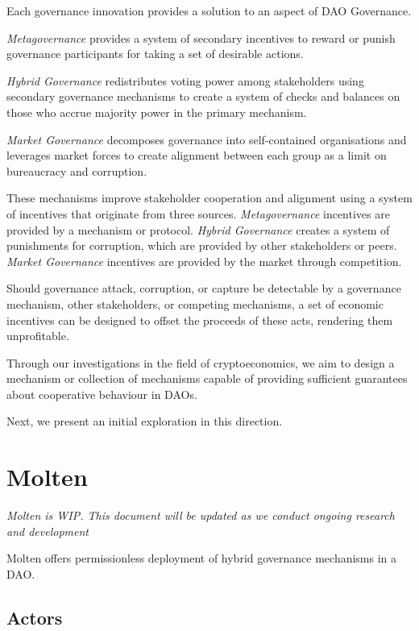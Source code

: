 \documentclass[
]{article}
\begin{document}
Each governance innovation provides a solution to an aspect of DAO
Governance.

\emph{Metagovernance} provides a system of secondary incentives to
reward or punish governance participants for taking a set of desirable
actions.

\emph{Hybrid Governance} redistributes voting power among stakeholders
using secondary governance mechanisms to create a system of checks and
balances on those who accrue majority power in the primary mechanism.

\emph{Market Governance} decomposes governance into self-contained
organisations and leverages market forces to create alignment between
each group as a limit on bureaucracy and corruption.

These mechanisms improve stakeholder cooperation and alignment using a
system of incentives that originate from three sources.
\emph{Metagovernance} incentives are provided by a mechanism or
protocol. \emph{Hybrid Governance} creates a system of punishments for
corruption, which are provided by other stakeholders or peers.
\emph{Market Governance} incentives are provided by the market through
competition.

Should governance attack, corruption, or capture be detectable by a
governance mechanism, other stakeholders, or competing mechanisms, a set
of economic incentives can be designed to offset the proceeds of these
acts, rendering them unprofitable.

Through our investigations in the field of cryptoeconomics, we aim to
design a mechanism or collection of mechanisms capable of providing
sufficient guarantees about cooperative behaviour in DAOs.

Next, we present an initial exploration in this direction.
\hypertarget{molten}{%
\section{Molten}\label{molten}}

\emph{Molten is WIP. This document will be updated as we conduct ongoing
research and development}

Molten offers permissionless deployment of hybrid governance mechanisms
in a DAO.

\hypertarget{actors}{%
\subsection{Actors}\label{actors}}
\end{document}
